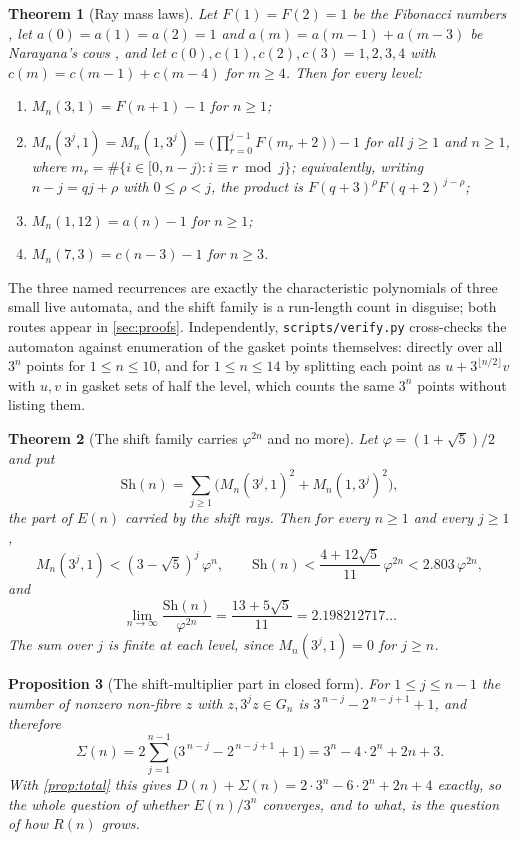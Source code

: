 \documentclass[11pt]{amsart}
\newtheorem{theorem}{Theorem}[section]
\newtheorem{proposition}[theorem]{Proposition}
\theoremstyle{definition}
\theoremstyle{remark}
\begin{document}
\begin{theorem}[Ray mass laws]
\label{thm:mass}
Let $F(1)=F(2)=1$ be the Fibonacci numbers \cite{oeisA000045}, let $a(0)=a(1)=a(2)=1$ and $a(m)=a(m-1)+a(m-3)$ be Narayana's cows \cite{oeisA000930}, and let $c(0),c(1),c(2),c(3)=1,2,3,4$ with $c(m)=c(m-1)+c(m-4)$ for $m\ge 4$. Then for every level:
\begin{enumerate}
\item $M_n(3,1)=F(n+1)-1$ for $n\ge 1$;
\item $M_n(3^j,1)=M_n(1,3^j)=\bigl(\prod_{r=0}^{j-1} F(m_r+2)\bigr)-1$ for all $j\ge 1$ and $n\ge 1$, where $m_r=\#\{i\in[0,n-j): i\equiv r \bmod j\}$; equivalently, writing $n-j=qj+\rho$ with $0\le\rho<j$, the product is $F(q+3)^{\rho}F(q+2)^{\,j-\rho}$;
\item $M_n(1,12)=a(n)-1$ for $n\ge 1$;
\item $M_n(7,3)=c(n-3)-1$ for $n\ge 3$.
\end{enumerate}
\end{theorem}

The three named recurrences are exactly the characteristic polynomials of three small live automata, and the shift family is a run-length count in disguise; both routes appear in \cref{sec:proofs}. Independently, \texttt{scripts/verify.py} cross-checks the automaton against enumeration of the gasket points themselves: directly over all $3^n$ points for $1\le n\le 10$, and for $1\le n\le 14$ by splitting each point as $u+3^{\lfloor n/2\rfloor}v$ with $u,v$ in gasket sets of half the level, which counts the same $3^n$ points without listing them.

\begin{theorem}[The shift family carries $\varphi^{2n}$ and no more]
\label{thm:shift}
Let $\varphi=(1+\sqrt5)/2$ and put
\[
\mathrm{Sh}(n)=\sum_{j\ge 1}\bigl(M_n(3^j,1)^2+M_n(1,3^j)^2\bigr),
\]
the part of $E(n)$ carried by the shift rays. Then for every $n\ge 1$ and every $j\ge 1$,
\[
M_n(3^j,1) < (3-\sqrt5)^j\,\varphi^n , \qquad
\mathrm{Sh}(n) < \frac{4+12\sqrt5}{11}\,\varphi^{2n} < 2.803\,\varphi^{2n} ,
\]
and
\[
\lim_{n\to\infty}\frac{\mathrm{Sh}(n)}{\varphi^{2n}}=\frac{13+5\sqrt5}{11}=2.198212717\ldots
\]
The sum over $j$ is finite at each level, since $M_n(3^j,1)=0$ for $j\ge n$.
\end{theorem}

\begin{proposition}[The shift-multiplier part in closed form]
\label{prop:sigma}
For $1\le j\le n-1$ the number of nonzero non-fibre $z$ with $z,3^jz\in G_n$ is $3^{\,n-j}-2^{\,n-j+1}+1$, and therefore
\[
\Sigma(n)=2\sum_{j=1}^{n-1}\bigl(3^{\,n-j}-2^{\,n-j+1}+1\bigr)=3^n-4\cdot 2^n+2n+3 .
\]
With \cref{prop:total} this gives $D(n)+\Sigma(n)=2\cdot 3^n-6\cdot 2^n+2n+4$ exactly, so the whole question of whether $E(n)/3^n$ converges, and to what, is the question of how $R(n)$ grows.
\end{proposition}
\end{document}
